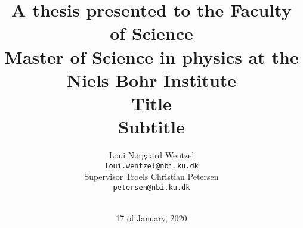 
\begin{titlepage}

\begin{addmargin}[-1cm]{-3cm}
\begin{center}
\large

\hfill
\vfill

\def \ColourPDF {FrontBackMatter/nat-farve.pdf}
\def \TitlePDF   {FrontBackMatter/nat-en.pdf}

\color{Maroon}\title{
  \normalsize{A thesis presented to the Faculty of Science} \\
  \large{Master of Science in physics at the Niels Bohr Institute} \\
  \vspace{2cm} 
  \Huge{Title}\\
  \huge{Subtitle}\\
}
\author{
  \Large{Loui Nørgaard Wentzel} \\
  \normalsize{\texttt{loui.wentzel@nbi.ku.dk}}
  \vspace{1.5cm} \\
  \Large{Supervisor Troels Christian Petersen} \\
  \normalsize{\texttt{petersen@nbi.ku.dk}} \\
  \vspace{1cm} \\
}
\date{17 of January, 2020}
\vfill

\end{center}
\end{addmargin}

\end{titlepage}